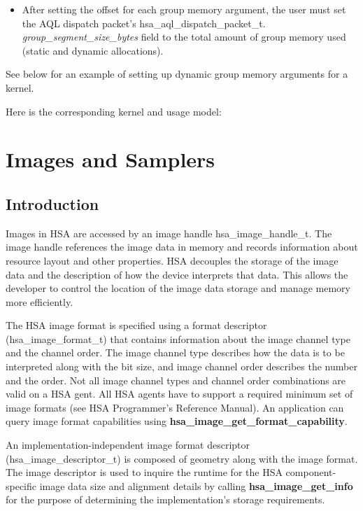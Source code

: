 \documentclass[draft]{book}
\newcommand{\reffun}[1]{\textbf{#1}}
\newcommand{\reffld}[1]{\textit{#1}}
\newcommand{\reftyp}[1]{#1}
\begin{document}
\begin{appendices}
\begin{itemize}
\item After setting the offset for each group memory argument, the user must set
  the AQL dispatch packet's \reftyp{hsa_aql_dispatch_packet_t}.\reffld{
    group_segment_size_bytes} field to the total amount of group memory used
  (static and dynamic allocations).

\end{itemize}

See below for an example of setting up dynamic group memory arguments for a
kernel.  

Here is the corresponding kernel and usage model:



\chapter{Images and Samplers}
\label{images} \hypertarget{images}{}
\section{Introduction}
Images in HSA are accessed by an image handle
\reftyp{hsa_image_handle_t}. The image handle references the image data in
memory and records information about resource layout and other properties. HSA
decouples the storage of the image data and the description of how the device
interprets that data. This allows the developer to control the location of the
image data storage and manage memory more efficiently.

The HSA image format is specified using a format descriptor
(\reftyp{hsa_image_format_t}) that contains information about the image
channel type and the channel order. The image channel type describes how the
data is to be interpreted along with the bit size, and image channel order
describes the number and the order. Not all image channel types and channel
order combinations are valid on a HSA gent. All HSA agents have to support a
required minimum set of image formats (see HSA Programmer's Reference
Manual). An application can query image format capabilities using
\reffun{hsa_image_get_format_capability}.

An implementation-independent image format descriptor
(\reftyp{hsa_image_descriptor_t}) is composed of geometry along with the
image format. The image descriptor is used to inquire the runtime for the HSA
component-specific image data size and alignment details by calling
\reffun{hsa_image_get_info} for the purpose of determining the
implementation's storage requirements.


\end{appendices}
\end{document}
